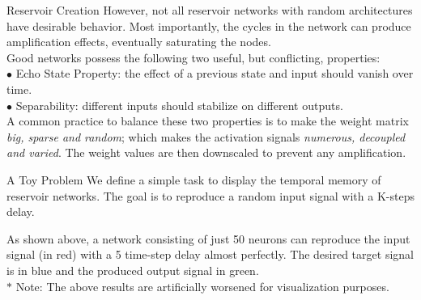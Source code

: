 \documentclass[final]{beamer}
\begin{document}
\begin{columns}[t]
\begin{column}{.45\linewidth}
\begin{block}{\vspace{-10 mm} \LARGE Reservoir Creation}
\large
However, not all reservoir networks with random architectures have desirable behavior. Most importantly, the cycles in the network can produce amplification effects, eventually saturating the nodes. \\
Good networks possess the following two useful, but conflicting, properties:\\
$\bullet$ Echo State Property: the effect of a previous state and input should vanish over time.\\
$\bullet$ Separability: different inputs should stabilize on different outputs. \\
\bigskip
A common practice to balance these two properties is to make the weight matrix {\em big, sparse and random}; which makes the activation signals {\em numerous, decoupled and varied}. The weight values are then downscaled to prevent any amplification.


\end{block}

\bigskip 

\begin{block}{\vspace{-13 mm} \LARGE A Toy Problem}
\large
We define a simple task to display the temporal memory of reservoir networks. The goal is to reproduce a random input signal with a K-steps delay.
\bigskip

\begin{figure}[t]
\end{figure}
As shown above, a network consisting of just 50 neurons can reproduce the input signal (in red) with a 5 time-step delay almost perfectly. The desired target signal is in blue and the produced output signal in green.\\
\bigskip
\normalsize
$\ast$ Note: The above results are artificially worsened for visualization purposes.


\end{block}


\end{column}
\end{columns}
\end{document}
